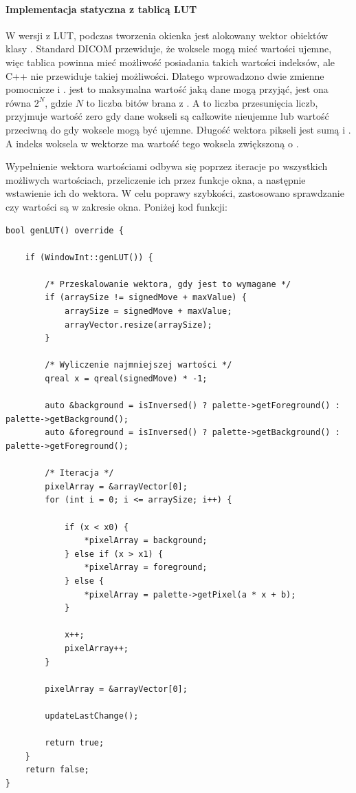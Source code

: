 \paragraph{Implementacja statyczna z tablicą LUT}
\par
W wersji z LUT, podczas tworzenia okienka jest alokowany wektor obiektów  klasy .
Standard DICOM przewiduje, że woksele mogą mieć wartości ujemne, więc tablica powinna mieć możliwość posiadania takich wartości indeksów, ale C++ nie przewiduje takiej możliwości.
Dlatego wprowadzono dwie zmienne pomocnicze  i .
 jest to maksymalna wartość jaką dane mogą przyjąć, jest ona równa $2^N$, gdzie $N$ to liczba bitów brana z .
A  to liczba przesunięcia liczb, przyjmuje wartość zero gdy dane wokseli są całkowite nieujemne lub wartość przeciwną do  gdy woksele mogą być ujemne.
Długość wektora pikseli jest sumą  i .
A indeks woksela w wektorze ma wartość tego woksela zwiększoną o .
\par
Wypełnienie wektora wartościami odbywa się poprzez iteracje po wszystkich możliwych wartościach, przeliczenie ich przez funkcje okna, a następnie wstawienie ich do wektora.
W celu poprawy szybkości, zastosowano sprawdzanie czy wartości są w zakresie okna.
Poniżej kod funkcji:
\begin{lstlisting}
bool genLUT() override {

    if (WindowInt::genLUT()) {

        /* Przeskalowanie wektora, gdy jest to wymagane */
        if (arraySize != signedMove + maxValue) {
            arraySize = signedMove + maxValue;
            arrayVector.resize(arraySize);
        }

        /* Wyliczenie najmniejszej wartości */
        qreal x = qreal(signedMove) * -1;

        auto &background = isInversed() ? palette->getForeground() : palette->getBackground();
        auto &foreground = isInversed() ? palette->getBackground() : palette->getForeground();

        /* Iteracja */
        pixelArray = &arrayVector[0];
        for (int i = 0; i <= arraySize; i++) {

            if (x < x0) {
                *pixelArray = background;
            } else if (x > x1) {
                *pixelArray = foreground;
            } else {
                *pixelArray = palette->getPixel(a * x + b);
            }

            x++;
            pixelArray++;
        }

        pixelArray = &arrayVector[0];

        updateLastChange();

        return true;
    }
    return false;
}
\end{lstlisting}

